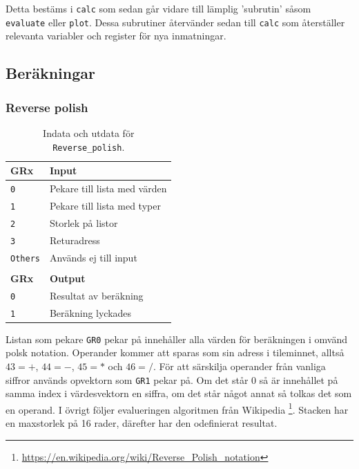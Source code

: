 \documentclass[]{article}
\begin{document}
Detta bestäms i \texttt{calc} som sedan går vidare till lämplig 'subrutin' såsom \texttt{evaluate} eller \texttt{plot}. Dessa subrutiner återvänder sedan till \texttt{calc} som återställer relevanta variabler och register för nya inmatningar.

\subsection{Beräkningar}
\subsubsection{Reverse polish}
\label{sec:reversepolish}

\begin{table}[H]
\centering
\begin{tabular}{ll}
	\textbf{GRx}    & \textbf{Input}               \\ \hline
	\texttt{0}      & Pekare till lista med värden \\
	\texttt{1}      & Pekare till lista med typer  \\
	\texttt{2}      & Storlek på listor            \\
	\texttt{3}      & Returadress                  \\
	\texttt{Others} & Används ej till input        \\
	                &  \\
	\textbf{GRx}    & \textbf{Output}              \\ \hline
	\texttt{0}      & Resultat av beräkning        \\
	\texttt{1}      & Beräkning lyckades
\end{tabular}
\caption{Indata och utdata för \texttt{Reverse\_polish}.}
\end{table}

\noindent
Listan som pekare \texttt{GR0} pekar på innehåller alla värden för beräkningen i omvänd polsk notation. Operander kommer att sparas som sin adress i tileminnet, alltså $43=+$, $44=-$, $45=*$ och $46=/$. För att särskilja operander från vanliga siffror används opvektorn som \texttt{GR1} pekar på. Om det står 0 så är innehållet på samma index i värdesvektorn en siffra, om det står något annat så tolkas det som en operand. I övrigt följer evalueringen algoritmen från Wikipedia \footnote{\href{https://en.wikipedia.org/wiki/Reverse_Polish_notation\#Postfix_algorithm}{\url{https://en.wikipedia.org/wiki/Reverse_Polish_notation}}}. Stacken har en maxstorlek på 16 rader, därefter har den odefinierat resultat. 
\end{document}
